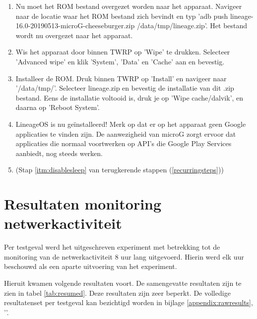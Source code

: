 \begin{enumerate}
    \item Nu moet het ROM bestand overgezet worden naar het apparaat. Navigeer naar de locatie waar het ROM bestand zich bevindt en typ 'adb push lineage-16.0-20190513-microG-cheeseburger.zip /data/tmp/lineage.zip'. Het bestand wordt nu overgezet naar het apparaat.
    
    \item Wis het apparaat door binnen TWRP op 'Wipe' te drukken. Selecteer 'Advanced wipe' en klik 'System', 'Data' en 'Cache' aan en bevestig.
    
    \item Installeer de ROM. Druk binnen TWRP op 'Install' en navigeer naar '/data/tmp/'. Selecteer lineage.zip en bevestig de installatie van dit .zip bestand. Eens de installatie voltooid is, druk je op 'Wipe cache/dalvik', en daarna op 'Reboot System'.
    
    \item 
    LineageOS is nu geïnstalleerd! Merk op dat er op het apparaat geen Google applicaties te vinden zijn. De aanwezigheid van microG zorgt ervoor dat applicaties die normaal voortwerken op API's die Google Play Services aanbiedt, nog steeds werken.
    
    \item 
     (Stap \ref{itm:disablesleep} van terugkerende stappen (\ref{recurringsteps}))
\end{enumerate}

\section{Resultaten monitoring netwerkactiviteit}

Per testgeval werd het uitgeschreven experiment met betrekking tot de monitoring van de netwerkactiviteit 8 uur lang uitgevoerd. Hierin werd elk uur beschouwd als een aparte uitvoering van het experiment.

Hieruit kwamen volgende resultaten voort. De samengevatte resultaten zijn te zien in tabel \ref{tab:resumed}. Deze resultaten zijn zeer beperkt. De volledige resultatenset per testgeval kan bezichtigd worden in bijlage \ref{appendix:rawresults}, ''.

